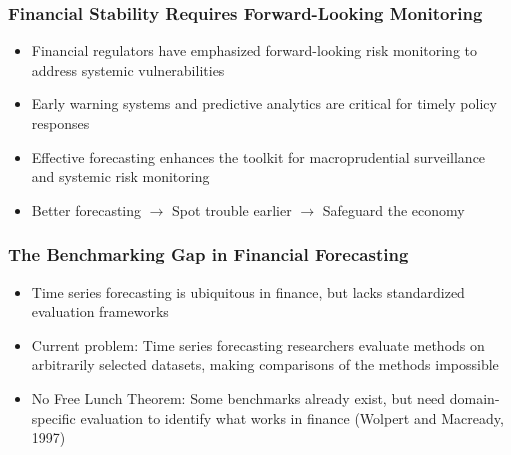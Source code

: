 \documentclass[ignorenonframetext, 9pt]{beamer}
\begin{document}
\begin{frame}
\frametitle{Financial Stability Requires Forward-Looking Monitoring}
\begin{itemize}
\item Financial regulators have emphasized \alert{forward-looking risk monitoring} to address systemic vulnerabilities
\vspace{0.3cm}
\item Early warning systems and predictive analytics are critical for timely policy responses
\vspace{0.3cm}
\item Effective forecasting enhances the toolkit for macroprudential surveillance and systemic risk monitoring
\vspace{0.3cm}
\item \alert{Better forecasting $\rightarrow$ Spot trouble earlier $\rightarrow$ Safeguard the economy}
\end{itemize}
\end{frame}

\begin{frame}
\frametitle{The Benchmarking Gap in Financial Forecasting}
\begin{itemize}
\item Time series forecasting is ubiquitous in finance, but lacks standardized evaluation frameworks
\vspace{0.2cm}
\item Current problem: Time series forecasting researchers evaluate methods on \alert{arbitrarily selected datasets}, making comparisons of the methods impossible
\vspace{0.2cm}
\item \alert{No Free Lunch Theorem}: Some benchmarks already exist, but need domain-specific evaluation to identify what works in finance (Wolpert and Macready, 1997)
\end{itemize}
\end{frame}
\end{document}
